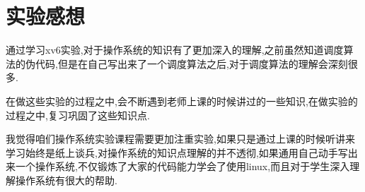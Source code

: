 \documentclass[a4paper,12pt]{report}
\begin{document}
\chapter{实验感想}
\begin{spacing}{1.5}
	通过学习xv6实验,对于操作系统的知识有了更加深入的理解,之前虽然知道调度算法的伪代码,但是在自己写出来了一个调度算法之后,对于调度算法的理解会深刻很多.

    在做这些实验的过程之中,会不断遇到老师上课的时候讲过的一些知识,在做实验的过程之中,复习巩固了这些知识点.

    我觉得咱们操作系统实验课程需要更加注重实验,如果只是通过上课的时候听讲来学习始终是纸上谈兵,对操作系统的知识点理解的并不透彻,如果通用自己动手写出来一个操作系统,不仅锻炼了大家的代码能力学会了使用linux,而且对于学生深入理解操作系统有很大的帮助.
\end{spacing}

%
%	
%
%	

\end{document}
